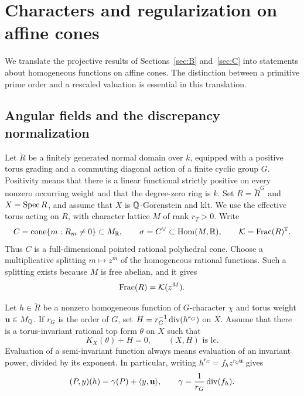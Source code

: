 \section{Characters and regularization on affine cones}\label{sec:D}

We translate the projective results of Sections~\ref{sec:B} and~\ref{sec:C}
into statements about homogeneous functions on affine cones.  The distinction
between a primitive prime order and a rescaled valuation is essential in this
translation.

\subsection{Angular fields and the discrepancy normalization}

Let $\breve R$ be a finitely generated normal domain over $k$, equipped with a
positive torus grading and a commuting diagonal action of a finite cyclic
group $G$.  Positivity means that there is a linear functional strictly
positive on every nonzero occurring weight and that the degree-zero ring is
$k$.  Set $R=\breve R^G$ and $X=\operatorname{Spec} R$, and assume that $X$ is
$\mathbb Q$-Gorenstein and klt.  We use the effective torus acting on $R$, with
character lattice $M$ of rank $r_T>0$.  Write
\[
 C=\operatorname{cone}\{m:R_m\ne0\}\subset M_{\mathbb R},\qquad
 \sigma=C^\vee\subset\operatorname{Hom}(M,\mathbb R),\qquad
 \mathcal K=\operatorname{Frac}(R)^{\mathbb T}.
\]
Thus $C$ is a full-dimensional pointed rational polyhedral cone.  Choose a
multiplicative splitting $m\mapsto z^m$ of the homogeneous rational
functions.  Such a splitting exists because $M$ is free abelian, and it gives
\begin{equation}\label{eq:D-angular-field}
 \operatorname{Frac}(R)=\mathcal K(z^M).
\end{equation}

Let $h\in\breve R$ be a nonzero homogeneous function of $G$-character $\chi$
and torus weight $\mathbf u\in M_{\mathbb Q}$.  If $r_G$ is the order of $G$, set
$H=r_G^{-1}\operatorname{div}(h^{r_G})$ on $X$.  Assume that there is a torus-invariant
rational top form $\theta$ on $X$ such that
\begin{equation}\label{eq:D-log-form}
 K_X(\theta)+H=0,\qquad (X,H)\text{ is lc}.
\end{equation}
Evaluation of a semi-invariant function always means evaluation of an
invariant power, divided by its exponent.  In particular, writing
$h^{r_G}=f_hz^{r_G\mathbf u}$ gives
\begin{equation}\label{eq:D-height-evaluation}
 (P,y)(h)=\gamma(P)+\langle y,\mathbf u\rangle,
 \qquad \gamma=\frac1{r_G}\operatorname{div}(f_h).
\end{equation}

